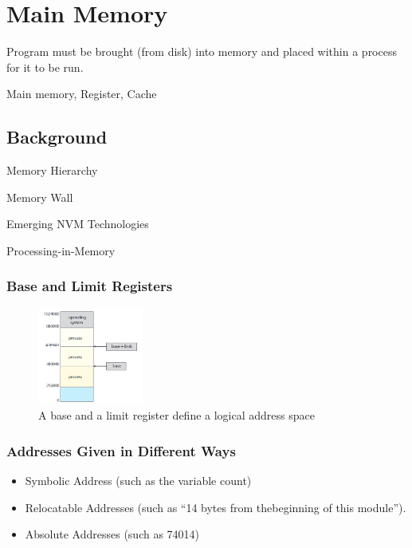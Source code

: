 \newpage
\section{Main Memory}
Program must be brought (from disk) into memory and placed within a process for it to be run. 

Main memory, Register, Cache
\subsection{Background}
Memory Hierarchy

Memory Wall

Emerging NVM Technologies

Processing-in-Memory

\subsubsection{Base and Limit Registers}
\begin{figure}[!htb]
    \centering
    \includegraphics[width=0.309\textwidth]{pic/OS8/A base and a limit register define a logical address space}
    \caption{A base and a limit register define a logical address space}
\end{figure}

\subsubsection{Addresses Given in Different Ways}
\begin{itemize}
    \item Symbolic Address (such as the variable count)
    \item Relocatable Addresses (such as ``14 bytes from thebeginning of this module'').
    \item Absolute Addresses (such as 74014)
\end{itemize}


